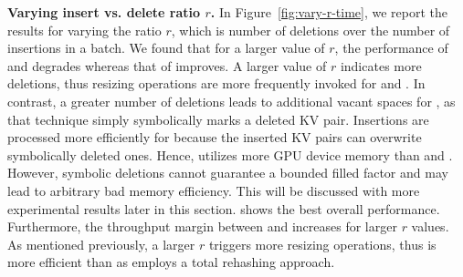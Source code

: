 \noindent\textbf{Varying insert vs. delete ratio $r$.}
In Figure~\ref{fig:vary-r-time}, we report the results for varying the ratio $r$, which is number of deletions over the number of insertions in a batch.
We found that for a larger value of $r$, the performance of \voter and \megakv degrades whereas that of \slab improves. A larger value of $r$ indicates more deletions, thus resizing operations are more frequently invoked for \voter and \megakv. In contrast, a greater number of deletions leads to additional vacant spaces for \slab, as that technique simply symbolically marks a deleted KV pair. Insertions are processed more efficiently for \slab because the inserted KV pairs can overwrite symbolically deleted ones. Hence, \slab utilizes more GPU device memory than \voter and \megakv. However, symbolic deletions cannot guarantee a bounded filled factor and may lead to arbitrary bad memory efficiency. This will be discussed with more experimental results later in this section.
\voter shows the best overall performance. Furthermore, the throughput margin between \voter and \megakv increases for larger $r$ values. 
As mentioned previously, a larger $r$ triggers more resizing operations, thus \voter is more efficient than \megakv as \megakv employs a total rehashing approach. 



